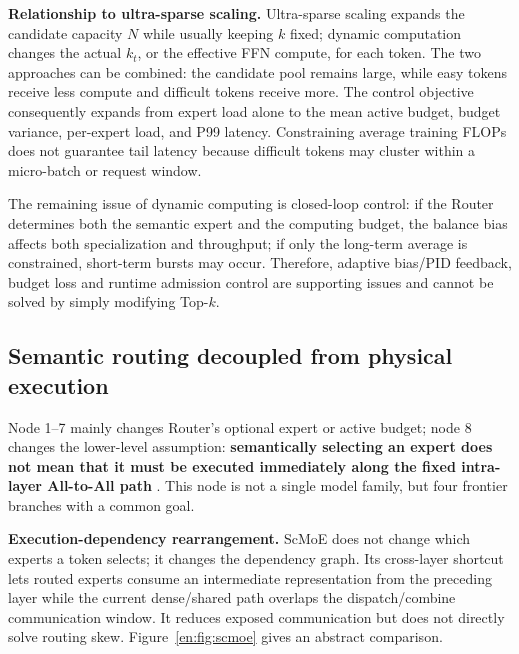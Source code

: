 \documentclass[10pt,a4paper,fontset=none]{ctexart}
\newcommand{\term}[1]{\textbf{#1}}
\begin{document}
\textbf{Relationship to ultra-sparse scaling.} Ultra-sparse scaling expands the candidate capacity $N$ while usually keeping $k$ fixed; dynamic computation changes the actual $k_t$, or the effective FFN compute, for each token. The two approaches can be combined: the candidate pool remains large, while easy tokens receive less compute and difficult tokens receive more. The control objective consequently expands from expert load alone to the mean active budget, budget variance, per-expert load, and P99 latency. Constraining average training FLOPs does not guarantee tail latency because difficult tokens may cluster within a micro-batch or request window.

The remaining issue of dynamic computing is closed-loop control: if the Router determines both the semantic expert and the computing budget, the balance bias affects both specialization and throughput; if only the long-term average is constrained, short-term bursts may occur. Therefore, adaptive bias/PID feedback, budget loss and runtime admission control are supporting issues and cannot be solved by simply modifying Top-$k$.

\subsection{Semantic routing decoupled from physical execution}

Node 1--7 mainly changes Router's optional expert or active budget; node 8 changes the lower-level assumption: \term{ semantically selecting an expert does not mean that it must be executed immediately along the fixed intra-layer All-to-All path }. This node is not a single model family, but four frontier branches with a common goal.

\textbf{Execution-dependency rearrangement.} ScMoE does not change which experts a token selects; it changes the dependency graph. Its cross-layer shortcut lets routed experts consume an intermediate representation from the preceding layer while the current dense/shared path overlaps the dispatch/combine communication window\cite{en:cai2024scmoe}. It reduces exposed communication but does not directly solve routing skew. Figure~\ref{en:fig:scmoe} gives an abstract comparison.
\end{document}
